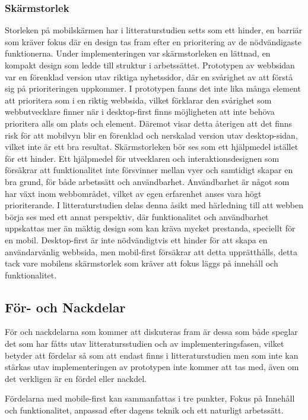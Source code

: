 \documentclass[11pt]{article}
\begin{document}
\subsubsection{Skärmstorlek}
Storleken på mobilskärmen har i litteraturstudien setts som ett hinder, en barriär som kräver fokus där en design tas fram efter en prioritering av de nödvändigaste funktionerna. Under implementeringen var skärmstorleken en lättnad, en kompakt design som ledde till struktur i arbetssättet. Prototypen av webbsidan var en förenklad version utav riktiga nyhetssidor, där en svårighet av att förstå sig på prioriteringen uppkommer. I prototypen fanns det inte lika många element att prioritera som i en riktig webbsida, vilket förklarar den svårighet som webbutvecklare finner när i desktop-first finns möjligheten att inte behöva prioritera alls om plats och element. Däremot visar detta återigen att det finns risk för att mobilvyn blir en förenklad och nerskalad version utav desktop-sidan, vilket inte är ett bra resultat. Skärmstorleken bör ses som ett hjälpmedel istället för ett hinder. Ett hjälpmedel för utvecklaren och interaktionsdesignen som försäkrar att funktionalitet inte försvinner mellan vyer och samtidigt skapar en bra grund, för både arbetssätt och användbarhet. Användbarhet är något som har växt inom webbområdet, vilket av egen erfarenhet anses vara högt prioriterande. I litteraturstudien delas denna åsikt med härledning till att webben börja ses med ett annat perspektiv, där funktionalitet och användbarhet uppskattas mer än mäktig design som kan kräva mycket prestanda, speciellt för en mobil. Desktop-first är inte nödvändigtvis ett hinder för att skapa en användarvänlig webbsida, men mobil-first försäkrar att detta upprätthålls, detta tack vare mobilens skärmstorlek som kräver att fokus läggs på innehåll och funktionalitet.

\subsection{För- och Nackdelar}
För och nackdelarna som kommer att diskuteras fram är dessa som både speglar det som har fåtts utav litteratursstudien och av implementeringsfasen, vilket betyder att fördelar så som att endast finns i litteraturstudien men som inte kan stärkas utav implementeringen av prototypen inte kommer att tas med, även om det verkligen är en fördel eller nackdel.

Fördelarna med mobile-first kan sammanfattas i tre punkter, Fokus på Innehåll och funktionalitet, anpassad efter dagens teknik och ett naturligt arbetssätt. 
\end{document}
